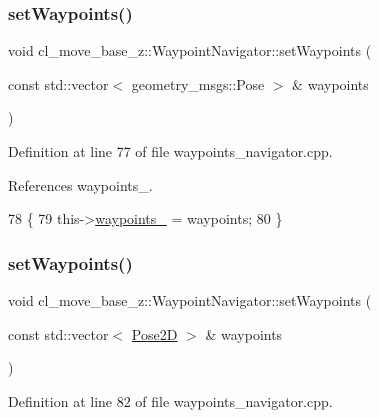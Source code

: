 \subsubsection{\texorpdfstring{set\+Waypoints()}{setWaypoints()}\hspace{0.1cm}{\footnotesize\ttfamily [1/2]}}
{\footnotesize\ttfamily void cl\+\_\+move\+\_\+base\+\_\+z\+::\+Waypoint\+Navigator\+::set\+Waypoints (\begin{DoxyParamCaption}\item[{const std\+::vector$<$ geometry\+\_\+msgs\+::\+Pose $>$ \&}]{waypoints }\end{DoxyParamCaption})}



Definition at line 77 of file waypoints\+\_\+navigator.\+cpp.



References waypoints\+\_\+.


\begin{DoxyCode}
78 \{
79   this->\hyperlink{classcl__move__base__z_1_1WaypointNavigator_a727f6a73e15ff5dc6bb3ffdf52c3d832}{waypoints\_} = waypoints;
80 \}
\end{DoxyCode}
\mbox{\label{classcl__move__base__z_1_1WaypointNavigator_aa164ff2510b9549b0b73df6eb18a7a4f}} 
\subsubsection{\texorpdfstring{set\+Waypoints()}{setWaypoints()}\hspace{0.1cm}{\footnotesize\ttfamily [2/2]}}
{\footnotesize\ttfamily void cl\+\_\+move\+\_\+base\+\_\+z\+::\+Waypoint\+Navigator\+::set\+Waypoints (\begin{DoxyParamCaption}\item[{const std\+::vector$<$ \hyperlink{structcl__move__base__z_1_1Pose2D}{Pose2D} $>$ \&}]{waypoints }\end{DoxyParamCaption})}



Definition at line 82 of file waypoints\+\_\+navigator.\+cpp.



